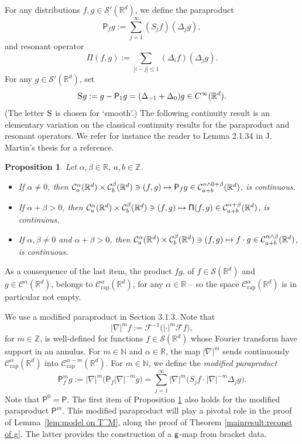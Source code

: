 \documentclass[JEP,XML,SOM,Unicode,published]{cedram}
\newcommand\mto{\mathchoice{\longmapsto}{\mapsto}{\mapsto}{\mapsto}}
\theoremstyle{plain}
\newtheorem{prop}[thm]{Proposition}
\theoremstyle{definition}
\newcommand{\rap}{\mathrm{rap}}
\newcommand{\sfP}{\mathsf{P}}
\newcommand{\sfPi}{\mathsf{\Pi}}
\newcommand{\bbN}{\mathbb{N}}
\newcommand{\bbR}{\mathbb{R}}
\newcommand{\mcC}{\mathcal{C}}
\newcommand{\mcF}{\mathcal{F}}
\newcommand\mcS{\mathcal{S}}
\begin{document}
For any distributions $f,g\in\mcS'(\bbR^d)$, we define the paraproduct\vspace*{-3pt}
\[
\sfP_fg:=\sum_{j=1}^\infty (S_jf) (\Delta_jg),
\]
and resonant operator\vspace*{-3pt}
\[
\sfPi(f,g):=\sum_{|i-j|\le1}(\Delta_if)(\Delta_jg).
\]
For any $g\in\mcS'(\bbR^d)$, set
\begin{equation} \label{EqDefnSmoothS}
\textsc{S} g := g - \sfP_1g = (\Delta_{-1} + \Delta_0)g \in C^\infty(\bbR^d).
\end{equation}
(The letter $\textsc{S}$ is chosen for `smooth'.) The following continuity result is an elementary variation on the classical continuity results for the paraproduct and resonant operators. We refer for instance the reader to Lemma 2.1.34 in J. Martin's thesis \cite{MartinThesis} for a reference.

\begin{prop}\label{prop:continuity of the paraproduct}
Let $\alpha,\beta\in\bbR$, $a,b\in\mathbb{Z}$.
\begin{itemize}
\item If $\alpha\neq0$, then $\mcC_a^\alpha(\bbR^d)\times \mcC_b^\beta(\bbR^d)\ni(f,g)\mto\sfP_fg\in \mcC_{a+b}^{\alpha\wedge0+\beta}(\bbR^d)$, is continuous.
\item If $\alpha+\beta>0$, then $\mcC_a^\alpha(\bbR^d)\times \mcC_b^\beta(\bbR^d)\ni(f,g)\mto\sfPi(f,g)\in \mcC_{a+b}^{\alpha+\beta}(\bbR^d)$, is continuous.
\item If $\alpha,\beta\neq0$ and $\alpha+\beta>0$, then $\mcC_a^\alpha(\bbR^d)\times \mcC_b^\beta(\bbR^d)\ni(f,g)\mto f\cdot g\in \mcC_{a+b}^{\alpha\wedge\beta}(\bbR^d)$, is continuous.
\end{itemize}
\end{prop}

As a consequence of the last item, the product $fg$, of $f\in\mcS(\bbR^d)$ and $g\in \mcC^\alpha(\bbR^d)$, belongs to $\mcC_\rap^\alpha(\bbR^d)$, for any $\alpha\in\bbR$ -- so the space $\mcC_\rap^\alpha(\bbR^d)$ is in particular not empty.

We use a modified paraproduct in Section 3.1.3. Note that
\[
|\nabla|^m f:=\mcF^{-1}\bigl(|{\cdot}|^m\mcF f\bigr),
\]
for $m\in\mathbb{Z}$, is well-defined for functions $f\in\mcS(\bbR^d)$ whose Fourier transform have support in an annulus. For $m\in\bbN$ and $\alpha\in\bbR$, the map $|\nabla|^m$ sends continuously $\mcC_\rap^\alpha(\bbR^d)$ into $\mcC_\rap^{\alpha-m}(\bbR^d)$. For $m\in\bbN$, we define the \emph{{modified paraproduct}}\vspace*{-3pt}
\[
\sfP_f^m g := |\nabla|^m\bigl(\sfP_f|\nabla|^{-m}g\bigr) = \sum_{j=1}^\infty|\nabla|^m\bigl(S_jf\cdot|\nabla|^{-m}\Delta_jg\bigr).
\]
Note that $\sfP^0=\sfP$. The first item of Proposition \ref{prop:continuity of the paraproduct} also holds for the modified paraproduct $\sfP^m$. This modified paraproduct will play a pivotal role in the proof of Lemma~\ref{lem:model on T^M}, along the proof of Theorem \ref{mainresult:reconst of g}. The latter provides the construction of a $\sf g$-map from bracket data.
\end{document}
